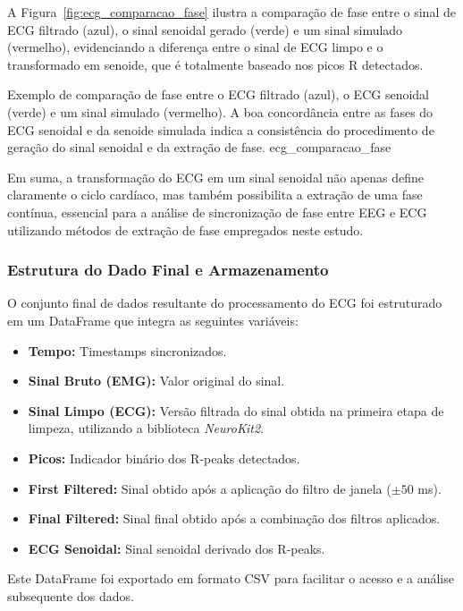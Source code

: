A Figura~\ref{fig:ecg_comparacao_fase} ilustra a comparação de fase entre o sinal de ECG filtrado (azul), o sinal senoidal gerado (verde) e um sinal simulado (vermelho), evidenciando a diferença entre o sinal de ECG limpo e o transformado em senoide, que é totalmente baseado nos picos R detectados.

{Exemplo de comparação de fase entre o ECG filtrado (azul), o ECG senoidal (verde) e um sinal simulado (vermelho). A boa concordância entre as fases do ECG senoidal e da senoide simulada indica a consistência do procedimento de geração do sinal senoidal e da extração de fase.}
{ecg_comparacao_fase}


Em suma, a transformação do ECG em um sinal senoidal não apenas define claramente o ciclo cardíaco, mas também possibilita a extração de uma fase contínua, essencial para a análise de sincronização de fase entre EEG e ECG utilizando métodos de extração de fase empregados neste estudo.

\subsubsection{Estrutura do Dado Final e Armazenamento}

O conjunto final de dados resultante do processamento do ECG foi estruturado em um DataFrame que integra as seguintes variáveis:
\begin{itemize}
    \item \textbf{Tempo:} Timestamps sincronizados.
    \item \textbf{Sinal Bruto (EMG):} Valor original do sinal.
    \item \textbf{Sinal Limpo (ECG):} Versão filtrada do sinal obtida na primeira etapa de limpeza, utilizando a biblioteca \textit{NeuroKit2}.
    \item \textbf{Picos:} Indicador binário dos R-peaks detectados.
    \item \textbf{First Filtered:} Sinal obtido após a aplicação do filtro de janela (\(\pm50\) ms).
    \item \textbf{Final Filtered:} Sinal final obtido após a combinação dos filtros aplicados.
    \item \textbf{ECG Senoidal:} Sinal senoidal derivado dos R-peaks.
\end{itemize}


Este DataFrame foi exportado em formato CSV para facilitar o acesso e a análise subsequente dos dados.
